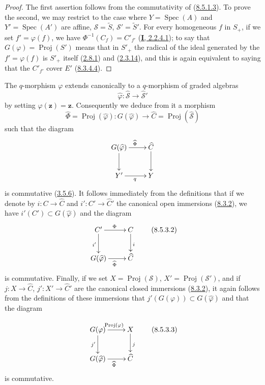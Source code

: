\begin{proof}
The first assertion follows from the commutativity of
(\hyperref[II.8.5.1.3]{8.5.1.3}). To prove the second, we may
restrict to the case where $Y=\operatorname{Spec}(A)$ and
$Y'=\operatorname{Spec}(A')$ are affine,
$\mathcal{S}=\widetilde{S}$, $\mathcal{S}'=\widetilde{S}'$. For every
homogeneous $f$ in $S_+$, if we set $f'=\varphi(f)$, we have
$\Phi^{-1}(C_f)=C'_{f'}$ (\hyperref[I.2.2.4.1]{\textbf{I}, 2.2.4.1}); to say that
$G(\varphi)=\operatorname{Proj}(S')$ means that in $S'_+$ the radical of
the ideal generated by the $f'=\varphi(f)$ is $S'_+$ itself
(\hyperref[II.2.8.1]{2.8.1}) and (\hyperref[II.2.3.14]{2.3.14}), and this
is again equivalent to saying that the $C'_{f'}$ cover $E'$
(\hyperref[II.8.3.4.4]{8.3.4.4}).
\end{proof}

\begin{env}[8.5.3]
\label{II.8.5.3}
The $q$-morphism $\varphi$ extends canonically to a $q$-morphism
of graded algebras
\begin{equation}
\label{II.8.5.3.1}
  \widehat{\varphi}:\widehat{\mathcal{S}}
  \to\widehat{\mathcal{S}}'
\tag{8.5.3.1}
\end{equation}
by setting $\widehat{\varphi}(\mathbf{z})=\mathbf{z}$. Consequently we deduce from it a morphism
\[
  \widehat{\Phi}=\operatorname{Proj}(\widehat{\varphi}):
  G(\widehat{\varphi})\to\widehat{C}
  =\operatorname{Proj}(\widehat{\mathcal{S}})
\]
such that the diagram
\[
  \xymatrix{
    G(\widehat{\varphi})\ar[r]^{\widehat{\Phi}}\ar[d] &
    \widehat{C}\ar[d]\\
    Y'\ar[r]_{q} & Y
  }
\]
is commutative (\hyperref[II.3.5.6]{3.5.6}). It follows immediately from the
definitions that if we denote by $i:C\to\widehat{C}$ and
$i':C'\to\widehat{C}'$ the canonical open immersions
(\hyperref[II.8.3.2]{8.3.2}), we have
$i'(C')\subset G(\widehat{\varphi})$ and the diagram
\begin{equation}
\label{II.8.5.3.2}
  \xymatrix{
    C'\ar[r]^{\Phi}\ar[d]_{i'} & C\ar[d]^{i}\\
    G(\widehat{\varphi})\ar[r]_{\widehat{\Phi}} & \widehat{C}
  }
\tag{8.5.3.2}
\end{equation}
is commutative. Finally, if we set
$X=\operatorname{Proj}(\mathcal{S})$, $X'=\operatorname{Proj}(\mathcal{S}')$,
and if $j:X\to\widehat{C}$, $j':X'\to\widehat{C}'$ are the canonical closed
immersions (\hyperref[II.8.3.2]{8.3.2}), it again follows from the
definitions of these immersions that
$j'(G(\varphi))\subset G(\widehat{\varphi})$ and that the diagram

\begin{equation}
\label{II.8.5.3.3}
  \xymatrix{
    G(\varphi)\ar[r]^{\operatorname{Proj}(\varphi)}\ar[d]_{j'} &
    X\ar[d]^{j}\\
    G(\widehat{\varphi})\ar[r]_{\widehat{\Phi}} & \widehat{C}
  }
\tag{8.5.3.3}
\end{equation}
is commutative.
\end{env}

